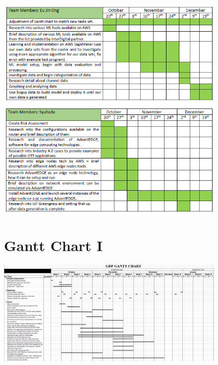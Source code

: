 \begin{figure}[ht]
    \centering
    \includegraphics{images/WBS3.png}
    \includegraphics{images/WBS4.png}
     \vspace*{7in}
    \label{fig:WBS2}
\end{figure}

\begin{landscape}
\begin{figure}[ht]
\begin{minipage}{\linewidth}
\section{Gantt Chart I}

   \centering
    \includegraphics[width=1\linewidth]{images/Gantt chart.PNG} 

    \label{appendix:Gantt}

\end{minipage}
\end{figure}
    \end{landscape}
    
